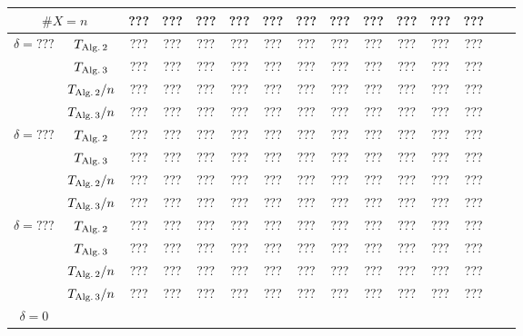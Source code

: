 \documentclass[12pt]{article}
\begin{document}
		\begin{table}[ht]
	\begin{center}\renewcommand{\arraystretch}{1.2}\small
		\setlength\tabcolsep{0.05cm}
		\begin{tabular}{|c|c||c|c|c|c|c|c|c|c|c|c|c|c|c|}
		\hline
		\multicolumn {2}{|c||}{\footnotesize $\#X=n$}  & ???& ???& ???& ???& ???& ???& ???& ???& ???& ???& ??? \\ 
		\hline		
		\hline
		\multirow{ 4}{*}{ $\delta = ???$}

        & $T_{\rm Alg.\, 2}$  &   ???& ???& ???& ???& ???& ???& ???& ???& ???& ???& ??? \\
        
        & $T_{\rm Alg.\, 3}$  &   ???& ???& ???& ???& ???& ???& ???& ???& ???& ???& ??? \\
		
		& $T_{\rm Alg.\, 2}/n$  &   ???& ???& ???& ???& ???& ???& ???& ???& ???& ???& ??? \\
		
		& $T_{\rm Alg.\, 3}/n$& ???& ???& ???& ???& ???& ???& ???& ???& ???& ???& ???   \\
		\hline
		\multirow{ 4}{*}{ $\delta = ???$}

        & $T_{\rm Alg.\, 2}$  &   ???& ???& ???& ???& ???& ???& ???& ???& ???& ???& ??? \\
        
        & $T_{\rm Alg.\, 3}$  &   ???& ???& ???& ???& ???& ???& ???& ???& ???& ???& ??? \\
		
		& $T_{\rm Alg.\, 2}/n$  &   ???& ???& ???& ???& ???& ???& ???& ???& ???& ???& ??? \\
		
		& $T_{\rm Alg.\, 3}/n$& ???& ???& ???& ???& ???& ???& ???& ???& ???& ???& ???   \\
		\hline
		\multirow{ 4}{*}{ $\delta = ???$}

        & $T_{\rm Alg.\, 2}$  &   ???& ???& ???& ???& ???& ???& ???& ???& ???& ???& ??? \\
        
        & $T_{\rm Alg.\, 3}$  &   ???& ???& ???& ???& ???& ???& ???& ???& ???& ???& ??? \\
		
		& $T_{\rm Alg.\, 2}/n$  &   ???& ???& ???& ???& ???& ???& ???& ???& ???& ???& ??? \\
		
		& $T_{\rm Alg.\, 3}/n$& ???& ???& ???& ???& ???& ???& ???& ???& ???& ???& ???   \\
		\hline
		\multirow{ 4}{*}{ $\delta = 0$}


\end{tabular}
\end{center}
\end{table}
\end{document}
